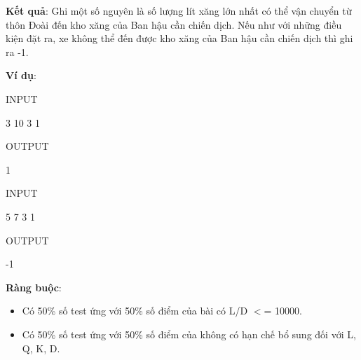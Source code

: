 \textbf{Kết quả}: Ghi một số nguyên là số lượng lít xăng lớn nhất có thể vận chuyển từ thôn Đoài đến kho xăng của Ban hậu cần chiến dịch. Nếu như với những điều kiện đặt ra, xe không thể đến được kho xăng của Ban hậu cần chiến dịch thì ghi ra -1.

\textbf{Ví dụ}:

INPUT

3 10 3 1

OUTPUT

1

INPUT

5 7 3 1

OUTPUT

-1

\textbf{Ràng buộc}:
\begin{itemize}
	\item Có 50\% số test ứng với 50\% số điểm của bài có L/D $<$= 10000.
	\item Có 50\% số test ứng với 50\% số điểm của không có hạn chế bổ sung đối với L, Q, K, D.
\end{itemize}